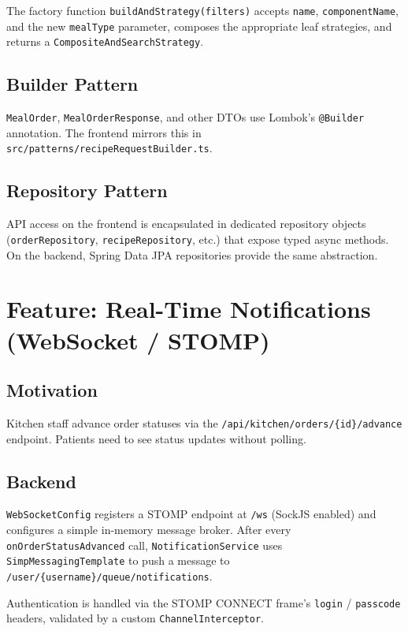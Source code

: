 \documentclass[12pt,a4paper]{article}
\begin{document}
The factory function \texttt{buildAndStrategy(filters)} accepts \texttt{name},
\texttt{componentName}, and the new \texttt{mealType} parameter, composes the
appropriate leaf strategies, and returns a \texttt{CompositeAndSearchStrategy}.

\subsection{Builder Pattern}
\texttt{MealOrder}, \texttt{MealOrderResponse}, and other DTOs use Lombok's
\texttt{@Builder} annotation.  The frontend mirrors this in
\texttt{src/patterns/recipeRequestBuilder.ts}.

\subsection{Repository Pattern}
API access on the frontend is encapsulated in dedicated repository objects
(\texttt{orderRepository}, \texttt{recipeRepository}, etc.) that expose typed
async methods.  On the backend, Spring Data JPA repositories provide the same
abstraction.

\section{Feature: Real-Time Notifications (WebSocket / STOMP)}

\subsection{Motivation}
Kitchen staff advance order statuses via the \texttt{/api/kitchen/orders/\{id\}/advance}
endpoint.  Patients need to see status updates without polling.

\subsection{Backend}
\texttt{WebSocketConfig} registers a STOMP endpoint at \texttt{/ws} (SockJS
enabled) and configures a simple in-memory message broker.  After every
\texttt{onOrderStatusAdvanced} call, \texttt{NotificationService} uses
\texttt{SimpMessagingTemplate} to push a message to
\texttt{/user/\{username\}/queue/notifications}.

Authentication is handled via the STOMP CONNECT frame's \texttt{login} /
\texttt{passcode} headers, validated by a custom \texttt{ChannelInterceptor}.
\end{document}
